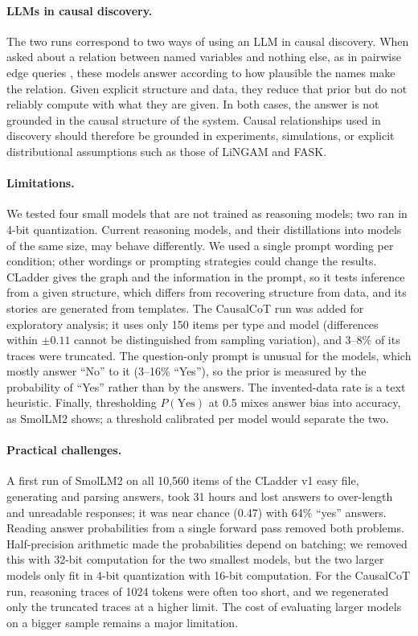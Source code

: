 \documentclass{llncs}
\begin{document}
\paragraph{LLMs in causal discovery.} The two runs correspond to two ways of using an LLM in causal discovery. When asked about a relation between named variables and nothing else, as in pairwise edge queries \cite{kiciman2023causal,long2023can}, these models answer according to how plausible the names make the relation. Given explicit structure and data, they reduce that prior but do not reliably compute with what they are given. In both cases, the answer is not grounded in the causal structure of the system. Causal relationships used in discovery should therefore be grounded in experiments, simulations, or explicit distributional assumptions such as those of LiNGAM and FASK.

\paragraph{Limitations.} We tested four small models that are not trained as reasoning models; two ran in 4-bit quantization. Current reasoning models, and their distillations into models of the same size, may behave differently. We used a single prompt wording per condition; other wordings or prompting strategies could change the results. CLadder gives the graph and the information in the prompt, so it tests inference from a given structure, which differs from recovering structure from data, and its stories are generated from templates. The CausalCoT run was added for exploratory analysis; it uses only 150 items per type and model (differences within $\pm 0.11$ cannot be distinguished from sampling variation), and 3--8\% of its traces were truncated. The question-only prompt is unusual for the models, which mostly answer ``No'' to it (3--16\% ``Yes''), so the prior is measured by the probability of ``Yes'' rather than by the answers. The invented-data rate is a text heuristic. Finally, thresholding $P(\text{Yes})$ at 0.5 mixes answer bias into accuracy, as SmolLM2 shows; a threshold calibrated per model would separate the two.

\paragraph{Practical challenges.} A first run of SmolLM2 on all 10,560 items of the CLadder v1 easy file, generating and parsing answers, took 31 hours and lost answers to over-length and unreadable responses; it was near chance (0.47) with 64\% ``yes'' answers. Reading answer probabilities from a single forward pass removed both problems. Half-precision arithmetic made the probabilities depend on batching; we removed this with 32-bit computation for the two smallest models, but the two larger models only fit in 4-bit quantization with 16-bit computation. For the CausalCoT run, reasoning traces of 1024 tokens were often too short, and we regenerated only the truncated traces at a higher limit. The cost of evaluating larger models on a bigger sample remains a major limitation.
\end{document}
